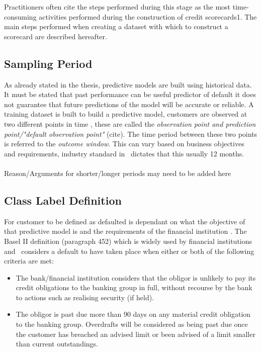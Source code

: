 Practitioners often cite the steps performed during this stage as the most time-consuming
activities performed during the construction of credit scorecards1. The
main steps performed when creating a dataset with which to construct a scorecard
are described hereafter.

\subsection{Sampling Period}
As already stated in the thesis, predictive models are built using historical data. It must be stated that past performance can be useful predictor of default it does not guarantee that future predictions of the model will be accurate or reliable. A training dataset is built to build a predictive model, customers are observed at two different points in time \citep{martens_credit_2010}, these are called the \textit{observation point and prediction point/"default observation point"} (cite). The time period between these two points is referred to the \textit{outcome window}. This can vary based on business objectives and requirements, industry standard in \subjectname\ dictates that this usually 12 months. \\\\

Reason/Arguments for shorter/longer periods may need to be added here \\

\subsection{Class Label Definition} \label{classLabelDef}
For customer to be defined as defaulted is dependant on what the objective of that predictive model is and the requirements of the financial institution \citep{mcnab_principles_2000}. The Basel II definition (paragraph 452) which is widely used by financial institutions and \subjectname\ considers a default to have taken place when either or both of the following criteria are met:
\vspace{-3mm} 
\begin{itemize}
	\item The bank/financial institution considers that the obligor is unlikely to pay its credit obligations to the banking group in full, without recourse by the bank to actions such as realising security (if held).
	\item The obligor is past due more than 90 days on any material credit obligation to the banking group. Overdrafts will be considered as being past due once the customer has breached an advised limit or been advised of a limit smaller than current outstandings.
\end{itemize} 

